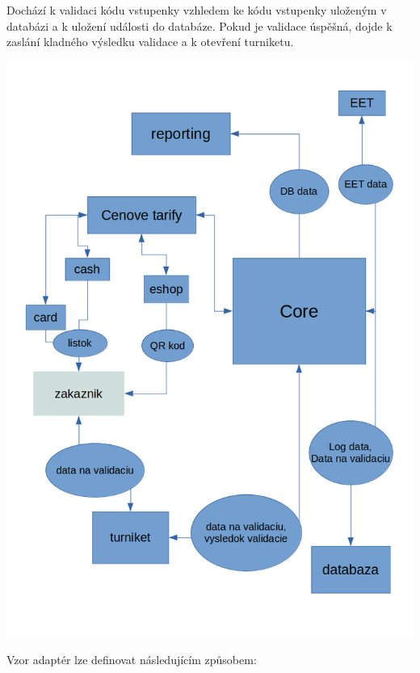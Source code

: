 \documentclass{homework}
\begin{document}
\maketitle


Dochází k validaci kódu vstupenky vzhledem ke kódu vstupenky uloženým v databázi a k uložení události do databáze. Pokud je validace úspěšná, dojde k zaslání kladného výsledku validace a k otevření turniketu. 


\begin{center}
\includegraphics[scale=0.25]{high_level_nakres.png}
\end{center}


Vzor adaptér lze definovat následujícím způsobem:
\end{document}
